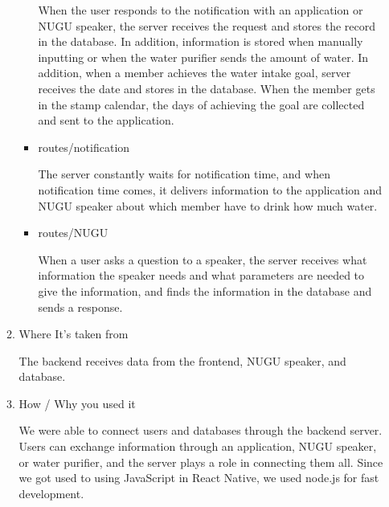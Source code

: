 \documentclass[conference]{IEEEtran}
\begin{document}
\begin{itemize}
\begin{enumerate}
\begin{itemize}
            When the user responds to the notification with an application or NUGU speaker, the server receives the request and stores the record in the database. In addition, information is stored when manually inputting or when the water purifier sends the amount of water. In addition, when a member achieves the water intake goal, server receives the date and stores in the database. When the member gets in the stamp calendar, the days of achieving the goal are collected and sent to the application.
            \item routes/notification 
            \setlength{\parindent}{2ex}
            
            The server constantly waits for notification time, and when notification time comes, it delivers information to the application and NUGU speaker about which member have to drink how much water.
            \item routes/NUGU
            \setlength{\parindent}{2ex}
            
            When a user asks a question to a speaker, the server receives what information the speaker needs and what parameters are needed to give the information, and finds the information in the database and sends a response.
            
        \end{itemize}
        
        
        \item Where It's taken from
        
        The backend receives data from the frontend, NUGU speaker, and database.
        \item How / Why you used it
        
        We were able to connect users and databases through the backend server. Users can exchange information through an application, NUGU speaker, or water purifier, and the server plays a role in connecting them all. Since we got used to using JavaScript in React Native, we used node.js for fast development.
    \end{enumerate}
\end{itemize}
\end{document}
